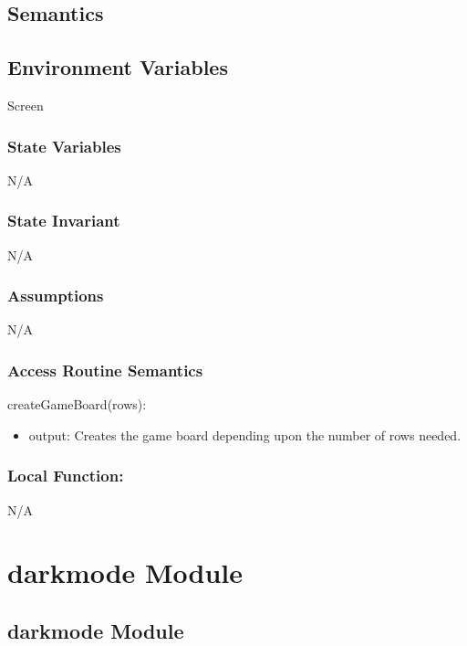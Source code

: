 \documentclass[12pt]{article}
\begin{document}
\subsection* {Semantics}

\subsection*{Environment Variables}

Screen

\subsubsection* {State Variables}
N/A

\subsubsection* {State Invariant}

N/A

\subsubsection* {Assumptions}

N/A

\subsubsection* {Access Routine Semantics}

\noindent createGameBoard(rows):
\begin{itemize}
  \item output: Creates the game board depending upon the number of rows needed.
\end{itemize}

\subsubsection*{Local Function:}

N/A

\newpage

\section {darkmode Module}

\subsection* {darkmode Module}
\end{document}
